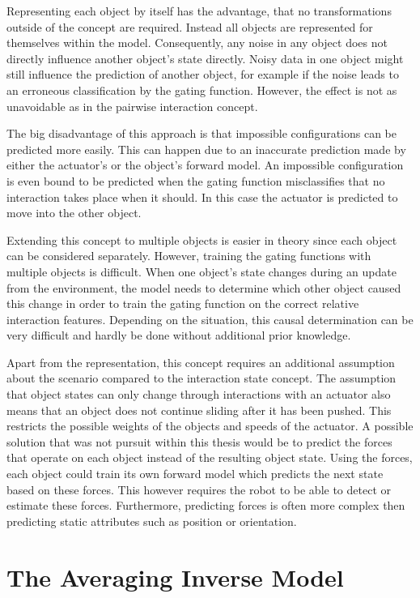 Representing each object by itself has the advantage, that no transformations outside of the concept are required. Instead all objects are represented for themselves within the model. 
Consequently, any noise in any object does not directly influence another object's state directly. Noisy data in one object might still influence the prediction of another object, for example if the noise leads to an erroneous classification by the gating function. However, the effect is not as unavoidable as in the pairwise interaction concept.

The big disadvantage of this approach is that impossible configurations can be predicted more easily. This can happen due to an inaccurate prediction made by either the actuator's or the object's forward model.
An impossible configuration is even bound to be predicted when the gating function misclassifies that no interaction takes place when it should. In this case the actuator is predicted to move into the other object.

Extending this concept to multiple objects is easier in theory since each object can be considered separately. However, training the gating functions with multiple objects is difficult. When one object's state changes during an update from the environment, the model needs to determine which other object caused this change in order to train the gating function on the correct relative interaction features. Depending on the situation, this causal determination can be very difficult and hardly be done without additional prior knowledge. 

Apart from the representation, this concept requires an additional assumption about the scenario compared to the interaction state concept. The assumption that object states can only change through interactions with an actuator also means that an object does not continue sliding after it has been pushed. This restricts the possible weights of the objects and speeds of the actuator.
A possible solution that was not pursuit within this thesis would be to predict the forces that operate on each object instead of the resulting object state. Using the forces, each object could train its own forward model which predicts the next state based on these forces. This however requires the robot to be able to detect or estimate these forces. Furthermore, predicting forces is often more complex then predicting static attributes such as position or orientation.


\section{The Averaging Inverse Model\label{sec:invModel}}

